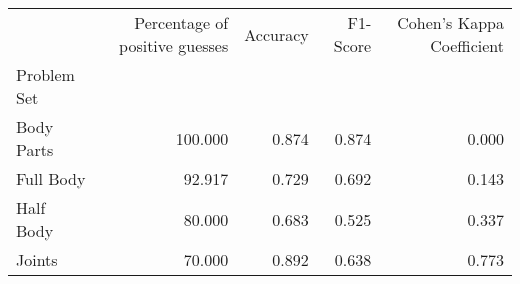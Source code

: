 \begin{table}
      \caption[]{}
      \label{}
      \begin{tabular}{lrrrr}
\hline
{} &  Percentage of positive guesses &  Accuracy &  F1-Score &  Cohen's Kappa Coefficient \\
Problem Set   &                                 &           &           &                            \\
\hline
Body Parts &                         100.000 &     0.874 &     0.874 &                      0.000 \\
Full Body  &                          92.917 &     0.729 &     0.692 &                      0.143 \\
Half Body  &                          80.000 &     0.683 &     0.525 &                      0.337 \\
Joints     &                          70.000 &     0.892 &     0.638 &                      0.773 \\
\hline
\end{tabular}
\end{table}